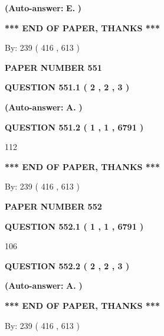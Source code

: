 \documentclass[12pt]{article}
\begin{document}
 
{\textbf{(Auto-answer:}}
{\textbf{\large{
E.}}}
{\textbf{)}}
 
 
   
   
   
   
\vspace{1.0in} 
{\textbf{\large{ *** END OF PAPER, THANKS *** }}} 
   
   
\hspace{1.0in} By: 
 239 ( 416 ,  613 )
   
   
   
   
\newpage 
\setcounter{page}{ 
   551001 } 
   
   
 {\textbf{ \Large{ PAPER NUMBER  551  }}}
   
   
   
   
  
  
{\textbf{\large{QUESTION
551.1 
 ( 2 , 2 , 3 )
}}}
 
 
{\textbf{(Auto-answer:}}
{\textbf{\large{
A.}}}
{\textbf{)}}
 
 
  
  
{\textbf{\large{QUESTION
551.2 
 ( 1 , 1 , 6791 )
}}}

112
   
   
   
   
\vspace{1.0in} 
{\textbf{\large{ *** END OF PAPER, THANKS *** }}} 
   
   
\hspace{1.0in} By: 
 239 ( 416 ,  613 )
   
   
   
   
\newpage 
\setcounter{page}{ 
   552001 } 
   
   
 {\textbf{ \Large{ PAPER NUMBER  552  }}}
   
   
   
   
  
  
{\textbf{\large{QUESTION
552.1 
 ( 1 , 1 , 6791 )
}}}

106
  
  
{\textbf{\large{QUESTION
552.2 
 ( 2 , 2 , 3 )
}}}
 
 
{\textbf{(Auto-answer:}}
{\textbf{\large{
A.}}}
{\textbf{)}}
 
 
   
   
   
   
\vspace{1.0in} 
{\textbf{\large{ *** END OF PAPER, THANKS *** }}} 
   
   
\hspace{1.0in} By: 
 239 ( 416 ,  613 )
   
   
   
\end{document}
